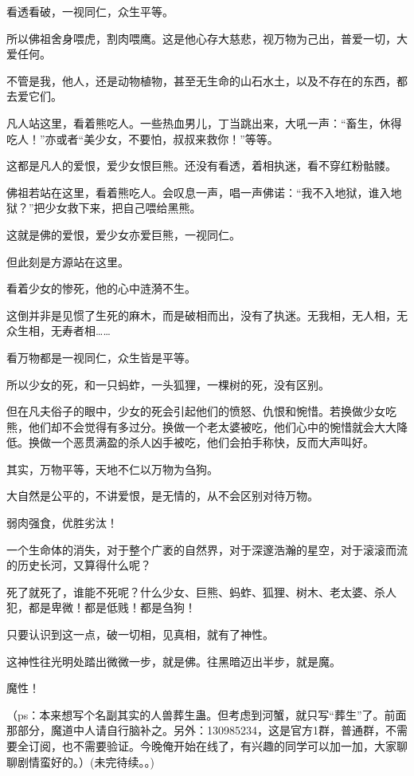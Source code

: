 \begin{this_body}
看透看破，一视同仁，众生平等。

所以佛祖舍身喂虎，割肉喂鹰。这是他心存大慈悲，视万物为己出，普爱一切，大爱任何。

不管是我，他人，还是动物植物，甚至无生命的山石水土，以及不存在的东西，都去爱它们。

凡人站这里，看着熊吃人。一些热血男儿，丁当跳出来，大吼一声：“畜生，休得吃人！”亦或者“美少女，不要怕，叔叔来救你！”等等。

这都是凡人的爱恨，爱少女恨巨熊。还没有看透，着相执迷，看不穿红粉骷髅。

佛祖若站在这里，看着熊吃人。会叹息一声，唱一声佛诺：“我不入地狱，谁入地狱？”把少女救下来，把自己喂给黑熊。

这就是佛的爱恨，爱少女亦爱巨熊，一视同仁。

但此刻是方源站在这里。

看着少女的惨死，他的心中涟漪不生。

这倒并非是见惯了生死的麻木，而是破相而出，没有了执迷。无我相，无人相，无众生相，无寿者相……

看万物都是一视同仁，众生皆是平等。

所以少女的死，和一只蚂蚱，一头狐狸，一棵树的死，没有区别。

但在凡夫俗子的眼中，少女的死会引起他们的愤怒、仇恨和惋惜。若换做少女吃熊，他们却不会觉得有多过分。换做一个老太婆被吃，他们心中的惋惜就会大大降低。换做一个恶贯满盈的杀人凶手被吃，他们会拍手称快，反而大声叫好。

其实，万物平等，天地不仁以万物为刍狗。

大自然是公平的，不讲爱恨，是无情的，从不会区别对待万物。

弱肉强食，优胜劣汰！

一个生命体的消失，对于整个广袤的自然界，对于深邃浩瀚的星空，对于滚滚而流的历史长河，又算得什么呢？

死了就死了，谁能不死呢？什么少女、巨熊、蚂蚱、狐狸、树木、老太婆、杀人犯，都是卑微！都是低贱！都是刍狗！

只要认识到这一点，破一切相，见真相，就有了神性。

这神性往光明处踏出微微一步，就是佛。往黑暗迈出半步，就是魔。

魔性！

（ps：本来想写个名副其实的人兽葬生蛊。但考虑到河蟹，就只写“葬生”了。前面那部分，魔道中人请自行脑补之。另外：130985234，这是官方1群，普通群，不需要全订阅，也不需要验证。今晚俺开始在线了，有兴趣的同学可以加一加，大家聊聊剧情蛮好的。）(未完待续。。)

\end{this_body}

